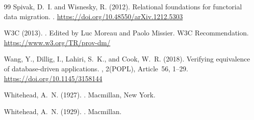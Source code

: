 \documentclass[11pt]{article}
\theoremstyle{definition}
\begin{document}
\begin{thebibliography}{99}
Spivak, D.~I. and Wisnesky, R. (2012).
\newblock Relational foundations for functorial data migration.
.
\newblock \url{https://doi.org/10.48550/arXiv.1212.5303}

W3C (2013).
.
\newblock Edited by Luc Moreau and Paolo Missier. W3C Recommendation.
\newblock \url{https://www.w3.org/TR/prov-dm/}

Wang, Y., Dillig, I., Lahiri, S.~K., and Cook, W.~R. (2018).
\newblock Verifying equivalence of database-driven applications.
, 2(POPL),
  Article~56, 1--29.
\newblock \url{https://doi.org/10.1145/3158144}

Whitehead, A.~N. (1927).
.
\newblock Macmillan, New York.

Whitehead, A.~N. (1929).
.
\newblock Macmillan.

\end{thebibliography}
\end{document}
